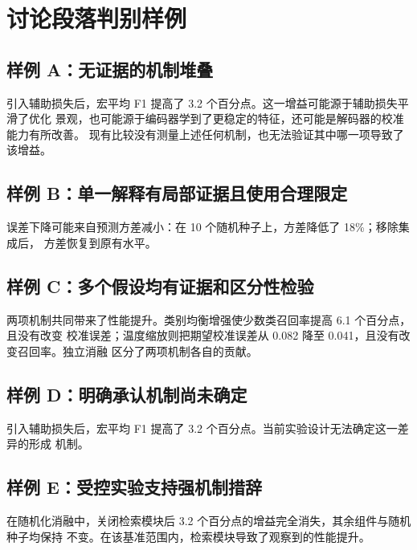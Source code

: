 \section{讨论段落判别样例}

\subsection{样例 A：无证据的机制堆叠}
引入辅助损失后，宏平均 F1 提高了 3.2 个百分点。这一增益可能源于辅助损失平滑了优化
景观，也可能源于编码器学到了更稳定的特征，还可能是解码器的校准能力有所改善。
现有比较没有测量上述任何机制，也无法验证其中哪一项导致了该增益。

\subsection{样例 B：单一解释有局部证据且使用合理限定}
误差下降可能来自预测方差减小：在 10 个随机种子上，方差降低了 18\%；移除集成后，
方差恢复到原有水平。

\subsection{样例 C：多个假设均有证据和区分性检验}
两项机制共同带来了性能提升。类别均衡增强使少数类召回率提高 6.1 个百分点，且没有改变
校准误差；温度缩放则把期望校准误差从 0.082 降至 0.041，且没有改变召回率。独立消融
区分了两项机制各自的贡献。

\subsection{样例 D：明确承认机制尚未确定}
引入辅助损失后，宏平均 F1 提高了 3.2 个百分点。当前实验设计无法确定这一差异的形成
机制。

\subsection{样例 E：受控实验支持强机制措辞}
在随机化消融中，关闭检索模块后 3.2 个百分点的增益完全消失，其余组件与随机种子均保持
不变。在该基准范围内，检索模块导致了观察到的性能提升。
